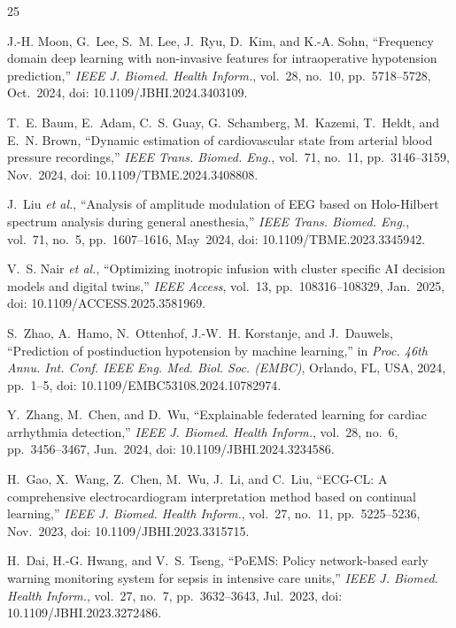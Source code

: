 \documentclass[conference]{IEEEtran}
\begin{document}
\begin{thebibliography}{25}

J.-H. Moon, G.~Lee, S.~M. Lee, J.~Ryu, D.~Kim, and K.-A. Sohn, ``Frequency domain deep learning with non-invasive features for intraoperative hypotension prediction,'' \textit{IEEE J. Biomed. Health Inform.}, vol.~28, no.~10, pp.~5718--5728, Oct.~2024, doi: 10.1109/JBHI.2024.3403109.

T.~E. Baum, E.~Adam, C.~S. Guay, G.~Schamberg, M.~Kazemi, T.~Heldt, and E.~N. Brown, ``Dynamic estimation of cardiovascular state from arterial blood pressure recordings,'' \textit{IEEE Trans. Biomed. Eng.}, vol.~71, no.~11, pp.~3146--3159, Nov.~2024, doi: 10.1109/TBME.2024.3408808.

J.~Liu \textit{et al.}, ``Analysis of amplitude modulation of EEG based on Holo-Hilbert spectrum analysis during general anesthesia,'' \textit{IEEE Trans. Biomed. Eng.}, vol.~71, no.~5, pp.~1607--1616, May~2024, doi: 10.1109/TBME.2023.3345942.

V.~S. Nair \textit{et al.}, ``Optimizing inotropic infusion with cluster specific AI decision models and digital twins,'' \textit{IEEE Access}, vol.~13, pp.~108316--108329, Jan.~2025, doi: 10.1109/ACCESS.2025.3581969.

S.~Zhao, A.~Hamo, N.~Ottenhof, J.-W.~H. Korstanje, and J.~Dauwels, ``Prediction of postinduction hypotension by machine learning,'' in \textit{Proc. 46th Annu. Int. Conf. IEEE Eng. Med. Biol. Soc. (EMBC)}, Orlando, FL, USA, 2024, pp.~1--5, doi: 10.1109/EMBC53108.2024.10782974.

Y.~Zhang, M.~Chen, and D.~Wu, ``Explainable federated learning for cardiac arrhythmia detection,'' \textit{IEEE J. Biomed. Health Inform.}, vol.~28, no.~6, pp.~3456--3467, Jun.~2024, doi: 10.1109/JBHI.2024.3234586.

H.~Gao, X.~Wang, Z.~Chen, M.~Wu, J.~Li, and C.~Liu, ``ECG-CL: A comprehensive electrocardiogram interpretation method based on continual learning,'' \textit{IEEE J. Biomed. Health Inform.}, vol.~27, no.~11, pp.~5225--5236, Nov.~2023, doi: 10.1109/JBHI.2023.3315715.

H.~Dai, H.-G. Hwang, and V.~S. Tseng, ``PoEMS: Policy network-based early warning monitoring system for sepsis in intensive care units,'' \textit{IEEE J. Biomed. Health Inform.}, vol.~27, no.~7, pp.~3632--3643, Jul.~2023, doi: 10.1109/JBHI.2023.3272486.


\end{thebibliography}
\end{document}
